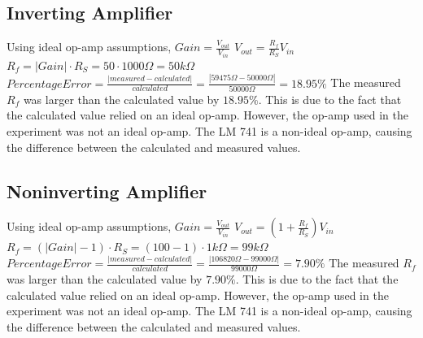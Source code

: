 \documentclass[10pt]{article}
\begin{document}
\subsection*{Inverting Amplifier}
\noindent Using ideal op-amp assumptions,
$Gain = \frac{V_{out}}{V_{in}}$
$V_{out} = \frac{R_f}{R_{S}}V_{in}$
$R_f = |Gain| \cdot R_{S} = 50 \cdot 1000\Omega = 50k\Omega$
$Percentage Error = \frac{|measured-calculated|}{calculated} = \frac{|59475\Omega-50000\Omega|}{50000\Omega} = 18.95\%$
\noindent The measured $R_f$ was larger than the calculated value by $18.95\%$. This is due to the fact that the calculated value relied on an ideal op-amp. However, the op-amp used in the experiment was not an ideal op-amp. The LM 741 is a non-ideal op-amp, causing the difference between the calculated and measured values.

\subsection*{Noninverting Amplifier}
\noindent Using ideal op-amp assumptions,
$Gain = \frac{V_{out}}{V_{in}}$
$V_{out} = (1+\frac{R_f}{R_{S}})V_{in}$
$R_f = (|Gain|-1)\cdot R_{S} = (100-1)\cdot 1k\Omega = 99k\Omega$
$Percentage Error = \frac{|measured-calculated|}{calculated} = \frac{|106820\Omega-99000\Omega|}{99000\Omega} = 7.90\%$
\noindent The measured $R_f$ was larger than the calculated value by $7.90\%$. This is due to the fact that the calculated value relied on an ideal op-amp. However, the op-amp used in the experiment was not an ideal op-amp. The LM 741 is a non-ideal op-amp, causing the difference between the calculated and measured values.
\end{document}
